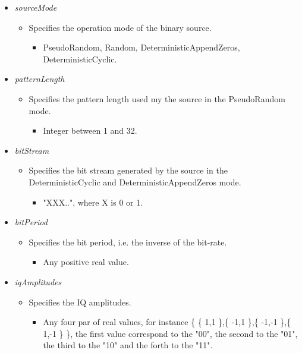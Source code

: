 \begin{refsection}
\begin{itemize}
   \item  \emph{sourceMode}
   \begin{itemize}
     \item  Specifies the operation mode of the binary source.
     \begin{itemize}
       \item  PseudoRandom, Random, DeterministicAppendZeros, DeterministicCyclic.
     \end{itemize}
   \end{itemize}

   \item  \emph{patternLength}
   \begin{itemize}
     \item  Specifies the pattern length used my the source in the PseudoRandom mode.
     \begin{itemize}
       \item  Integer between 1 and 32.
     \end{itemize}
   \end{itemize}

    \item  \emph{bitStream}
   \begin{itemize}
     \item  Specifies the bit stream generated by the source in the DeterministicCyclic and DeterministicAppendZeros mode.
     \begin{itemize}
       \item  "XXX..", where X is 0 or 1.
     \end{itemize}
   \end{itemize}

    \item  \emph{bitPeriod}
   \begin{itemize}
     \item  Specifies the bit period, i.e. the inverse of the bit-rate.
     \begin{itemize}
       \item  Any positive real value.
     \end{itemize}
   \end{itemize}

   \item  \emph{iqAmplitudes}
   \begin{itemize}
     \item  Specifies the IQ amplitudes.
     \begin{itemize}
       \item Any four par of real values, for instance \{ \{ 1,1 \},\{ -1,1 \},\{ -1,-1 \},\{ 1,-1 \} \}, the first value correspond to the "00", the second to the "01", the third to the "10" and the forth to the "11".
     \end{itemize}
   \end{itemize}


\end{itemize}
\end{refsection}
